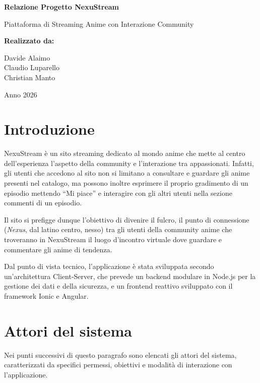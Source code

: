 \documentclass[11pt,a4paper]{article}
\begin{document}
\begin{titlepage}
    \centering
    \vspace*{2cm}
    {\huge \bfseries \color{darkblue} Relazione Progetto NexuStream \par}
    \vspace{1cm}
    {\large Piattaforma di Streaming Anime con Interazione Community \par}
    \vspace{3cm}
    {\large \bfseries Realizzato da:} \\
    \vspace{0.5cm}
    {\large Davide Alaimo \\ Claudio Luparello \\ Christian Manto \par}
    \vfill
    {\large Anno 2026 \par}
\end{titlepage}

\tableofcontents
\newpage

\section{Introduzione}
NexuStream è un sito streaming dedicato al mondo anime che mette al centro dell’esperienza l’aspetto della community e l’interazione tra appassionati. Infatti, gli utenti che accedono al sito non si limitano a consultare e guardare gli anime presenti nel catalogo, ma possono inoltre esprimere il proprio gradimento di un episodio mettendo ``Mi piace'' e interagire con gli altri utenti nella sezione commenti di un episodio. 

Il sito si prefigge dunque l’obiettivo di divenire il fulcro, il punto di connessione (\textit{Nexus}, dal latino centro, nesso) tra gli utenti della community anime che troveranno in NexuStream il luogo d’incontro virtuale dove guardare e commentare gli anime di tendenza.

Dal punto di vista tecnico, l’applicazione è stata sviluppata secondo un’architettura Client-Server, che prevede un backend modulare in Node.js per la gestione dei dati e della sicurezza, e un frontend reattivo sviluppato con il framework Ionic e Angular.

\section{Attori del sistema}
Nei punti successivi di questo paragrafo sono elencati gli attori del sistema, caratterizzati da specifici permessi, obiettivi e modalità di interazione con l’applicazione.
\end{document}
